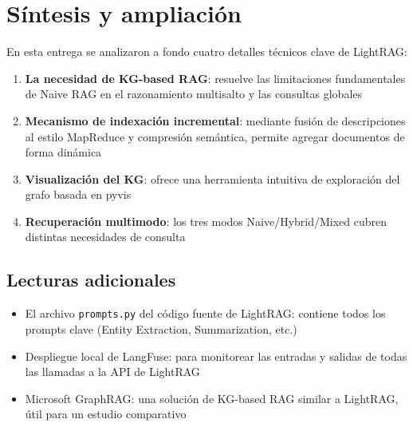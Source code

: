 \documentclass[a4paper]{article}
\begin{document}
\section{Síntesis y ampliación}

En esta entrega se analizaron a fondo cuatro detalles técnicos clave de LightRAG:

\begin{enumerate}
    \item \textbf{La necesidad de KG-based RAG}: resuelve las limitaciones fundamentales de Naive RAG en el razonamiento multisalto y las consultas globales
    \item \textbf{Mecanismo de indexación incremental}: mediante fusión de descripciones al estilo MapReduce y compresión semántica, permite agregar documentos de forma dinámica
    \item \textbf{Visualización del KG}: ofrece una herramienta intuitiva de exploración del grafo basada en pyvis
    \item \textbf{Recuperación multimodo}: los tres modos Naive/Hybrid/Mixed cubren distintas necesidades de consulta
\end{enumerate}

\subsection{Lecturas adicionales}

\begin{itemize}
    \item El archivo \texttt{prompts.py} del código fuente de LightRAG: contiene todos los prompts clave (Entity Extraction, Summarization, etc.)
    \item Despliegue local de LangFuse: para monitorear las entradas y salidas de todas las llamadas a la API de LightRAG
    \item Microsoft GraphRAG: una solución de KG-based RAG similar a LightRAG, útil para un estudio comparativo
\end{itemize}

\end{document}

